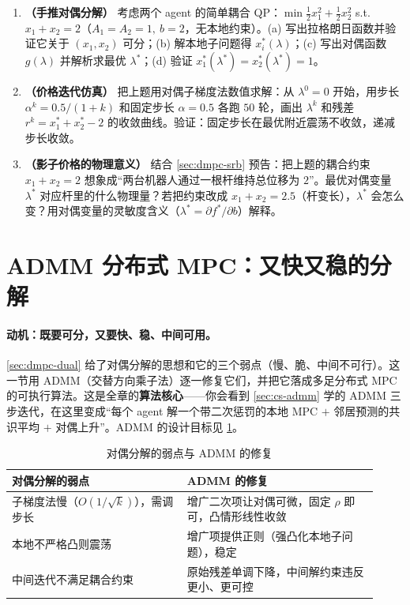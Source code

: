 \begin{exercise}
\begin{enumerate}
  \item \textbf{（手推对偶分解）} 考虑两个 agent 的简单耦合 QP：$\min \tfrac12 x_1^2+\tfrac12 x_2^2$ s.t.\ $x_1+x_2=2$（$A_1=A_2=1,\ b=2$，无本地约束）。(a) 写出拉格朗日函数并验证它关于 $(x_1,x_2)$ 可分；(b) 解本地子问题得 $x_i^*(\lambda)$；(c) 写出对偶函数 $g(\lambda)$ 并解析求最优 $\lambda^*$；(d) 验证 $x_1^*(\lambda^*)=x_2^*(\lambda^*)=1$。
  \item \textbf{（价格迭代仿真）} 把上题用对偶子梯度法数值求解：从 $\lambda^0=0$ 开始，用步长 $\alpha^k=0.5/(1+k)$ 和固定步长 $\alpha=0.5$ 各跑 $50$ 轮，画出 $\lambda^k$ 和残差 $r^k=x_1^*+x_2^*-2$ 的收敛曲线。验证：固定步长在最优附近震荡不收敛，递减步长收敛。
  \item \textbf{（影子价格的物理意义）} 结合 \cref{sec:dmpc-srb} 预告：把上题的耦合约束 $x_1+x_2=2$ 想象成“两台机器人通过一根杆维持总位移为 $2$”。最优对偶变量 $\lambda^*$ 对应杆里的什么物理量？若把约束改成 $x_1+x_2=2.5$（杆变长），$\lambda^*$ 会怎么变？用对偶变量的灵敏度含义（$\lambda^*=\partial f^*/\partial b$）解释。
\end{enumerate}
\end{exercise}

\section{ADMM 分布式 MPC：又快又稳的分解}
\label{sec:dmpc-admm}

\paragraph{动机：既要可分，又要快、稳、中间可用。}
\cref{sec:dmpc-dual} 给了对偶分解的思想和它的三个弱点（慢、脆、中间不可行）。这一节用 ADMM（交替方向乘子法）逐一修复它们，并把它落成多足分布式 MPC 的可执行算法。这是全章的\textbf{算法核心}——你会看到 \cref{sec:cs-admm} 学的 ADMM 三步迭代，在这里变成“每个 agent 解一个带二次惩罚的本地 MPC $+$ 邻居预测的共识平均 $+$ 对偶上升”。ADMM 的设计目标见 \cref{tab:dmpc-admm-fix}。

\begin{table}[H]\centering\small
\caption{对偶分解的弱点与 ADMM 的修复}
\label{tab:dmpc-admm-fix}
\begin{tabular}{p{0.44\linewidth}p{0.48\linewidth}}
\toprule
对偶分解的弱点 & ADMM 的修复 \\
\midrule
子梯度法慢（$O(1/\sqrt k)$），需调步长 & 增广二次项让对偶可微，固定 $\rho$ 即可，凸情形线性收敛 \\
本地不严格凸则震荡 & 增广项提供正则（强凸化本地子问题），稳定 \\
中间迭代不满足耦合约束 & 原始残差单调下降，中间解约束违反更小、更可控 \\
\bottomrule
\end{tabular}
\end{table}

